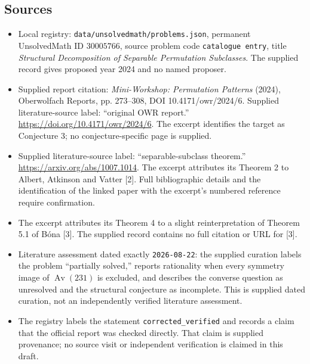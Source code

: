 \documentclass[11pt]{article}
\begin{document}
\subsection{Sources}
\begin{itemize}
\item Local registry: \texttt{data/unsolvedmath/problems.json}, permanent UnsolvedMath ID \(30005766\), source problem code \texttt{catalogue entry}, title \emph{Structural Decomposition of Separable Permutation Subclasses}. The supplied record gives proposed year 2024 and no named proposer.
\item Supplied report citation: \emph{Mini-Workshop: Permutation Patterns} (2024), Oberwolfach Reports, pp. 273--308, DOI 10.4171/owr/2024/6. Supplied literature-source label: ``original OWR report.'' \url{https://doi.org/10.4171/owr/2024/6}. The excerpt identifies the target as Conjecture 3; no conjecture-specific page is supplied.
\item Supplied literature-source label: ``separable-subclass theorem.'' \url{https://arxiv.org/abs/1007.1014}. The excerpt attributes its Theorem 2 to Albert, Atkinson and Vatter [2]. Full bibliographic details and the identification of the linked paper with the excerpt's numbered reference require confirmation.
\item The excerpt attributes its Theorem 4 to a slight reinterpretation of Theorem 5.1 of B\'ona [3]. The supplied record contains no full citation or URL for [3].
\item Literature assessment dated exactly \texttt{2026-08-22}: the supplied curation labels the problem ``partially solved,'' reports rationality when every symmetry image of \(\operatorname{Av}(231)\) is excluded, and describes the converse question as unresolved and the structural conjecture as incomplete. This is supplied dated curation, not an independently verified literature assessment.
\item The registry labels the statement \texttt{corrected\_verified} and records a claim that the official report was checked directly. That claim is supplied provenance; no source visit or independent verification is claimed in this draft.
\end{itemize}
\end{document}
